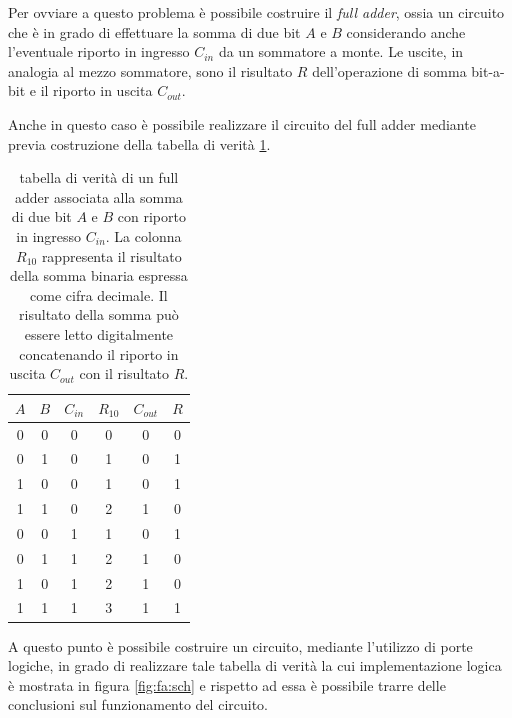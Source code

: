 	Per ovviare a questo problema è possibile costruire il \textit{full adder}, ossia un circuito che è in grado di effettuare la somma di due bit $A$ e $B$ considerando anche l'eventuale riporto in ingresso $C_{in}$ da un sommatore a monte. Le uscite, in analogia al mezzo sommatore, sono il risultato $R$ dell'operazione di somma bit-a-bit e il riporto in uscita $C_{out}$.
	
	Anche in questo caso è possibile realizzare il circuito del full adder mediante previa costruzione della tabella di verità \ref{tab:fa:tabella}.
	
	
	\begin{table}[bht]
		\centering
		\begin{tabular}{c c c | c | c c }
			$A$ & $B$ & $C_{in}$ & $R_{10}$ & $C_{out}$ & $R$ \\ \hline
			0 & 0 & 0 & 0 & 0 & 0 \\	
			0 & 1 & 0 & 1 & 0 & 1 \\	
			1 & 0 & 0 & 1 & 0 & 1 \\
			1 & 1 & 0 & 2 & 1 & 0 \\
			0 & 0 & 1 & 1 & 0 & 1 \\	
			0 & 1 & 1 & 2 & 1 & 0 \\	
			1 & 0 & 1 & 2 & 1 & 0 \\
			1 & 1 & 1 & 3 & 1 & 1 \\				
		\end{tabular}
		\caption{tabella di verità di un full adder associata alla somma di due bit $A$ e $B$ con riporto in ingresso $C_{in}$. La colonna $R_{10}$ rappresenta il risultato della somma binaria espressa come cifra decimale. Il risultato della somma può essere letto digitalmente concatenando il riporto in uscita $C_{out}$ con il risultato $R$.}
		\label{tab:fa:tabella}
	\end{table}
	
	A questo punto è possibile costruire un circuito, mediante l'utilizzo di porte logiche, in grado di realizzare tale tabella di verità la cui implementazione logica è mostrata in figura \ref{fig:fa:sch} e rispetto ad essa è possibile trarre delle conclusioni sul funzionamento del circuito.
	

